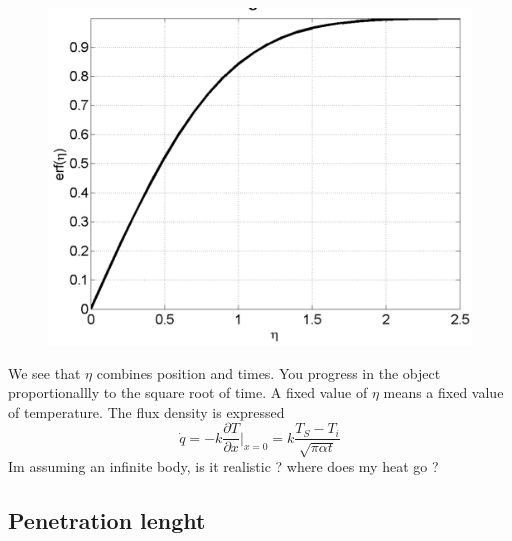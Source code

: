 		\begin{figure}
		\vspace{-5mm}
		\includegraphics[scale=0.2]{ch4/3}
		\end{figure}	
		We see that $\eta$ combines position and times. You progress in the object proportionallly to the square root of time. A fixed value of $\eta$ means a fixed value of temperature. The flux density is expressed 
		\begin{equation}
			\dot{q} = -k \frac{\partial T }{\partial x }| _{x=0} = k \frac{T_S-T_i}{\sqrt{\pi \alpha t}}
		\end{equation}
Im assuming an infinite body, is it realistic ? where does my heat go ?

	\subsection{Penetration lenght}
		
	
	